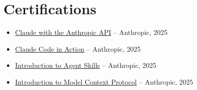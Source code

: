 \documentclass[letterpaper,10pt]{article}
\newcommand{\resumeItem}[1]{\item\small{#1}}
\newcommand{\resumeSubHeadingList}{\begin{itemize}[leftmargin=0.15in, label={}]}
\newcommand{\resumeSubHeadingListEnd}{\end{itemize}}
\begin{document}
\section{Certifications}
\resumeSubHeadingList
  \resumeItem{\href{https://verify.skilljar.com/c/ufyhuqnu7z75}{Claude with the Anthropic API} -- Anthropic, 2025}
  \resumeItem{\href{https://verify.skilljar.com/c/5wq8kmpa2jbk}{Claude Code in Action} -- Anthropic, 2025}
  \resumeItem{\href{https://verify.skilljar.com/c/f5vktmpg7und}{Introduction to Agent Skills} -- Anthropic, 2025}
  \resumeItem{\href{https://verify.skilljar.com/c/73xymxvikxt7}{Introduction to Model Context Protocol} -- Anthropic, 2025}
\resumeSubHeadingListEnd
\end{document}
